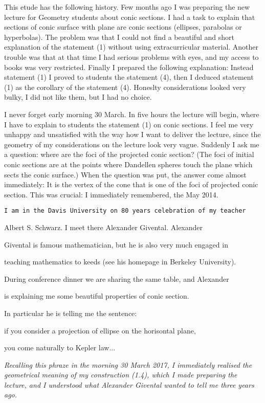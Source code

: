 {
  This etude has the following history.
Few months ago I was preparing the new lecture for 
Geometry students about conic sections.  
I had a task to explain
that sections of conic surface with plane are conic sections
  (ellipses, parabolas or hyperbolas).    
The problem was 
 that I could not  find a beautiful and 
short explanation
of the statement (1) without using extracurricular 
material.  Another trouble was that at that time I had
 serious problems with eyes,
and my  access to books was very restricted.
Finally I prepared the following  explanation:
Instead statement (1) I proved to students
the statement (4), then I deduced  
statement (1) as the corollary of the statement (4).
Honeslty  considerations looked very bulky, 
I did not like them, but I had no choice.   
 
   I never forget early morning 30 March.  
 In five  hours the lecture will begin, 
where I have to explain to students the statement
(1) on conic sections.
I feel me very unhappy and unsatisfied with  
the way how I want to deliver the lecture, 
since the geometry of my considerations on the lecture
look very vague.
 Suddenly I ask me a question:  
  where are the foci of the projected conic section? 
(The foci of initial conic sections are at 
the points  where
 Dandellen spheres touch the plane which sects the conic surface.)  
   When the question was put, 
the answer come almost immediately:
  It is the vertex of the cone 
that is one of  the foci of projected
  conic section. This was crucial:
I immediately remembered, the May 2014.  


{\tt I am in the  
 Davis University
on 80 years celebration of my teacher 

 Albert S. Schwarz.
I meet there Alexander Givental. Alexander 

Givental is famous mathematician, 
but he is also
very much  engaged  in 

teaching mathematics to keeds
(see his homepage in Berkeley University).

During conference 
dinner we are sharing the same table, and Alexander

is explaining me some beautiful 
properties of conic section.

In  particular he is telling  
me  the sentence: 

 if you consider  a projection of
ellipse on the horisontal plane, 

you come naturally to
Kepler law...
}
 
  {\sl Recalling this phraze in 
the morning 30 March 2017,
 I immediately realised the geometrical meaning
of my construction (1.4), which I made preparing the lecture, and I understood what Alexander Givental wanted
to tell me three years ago.   
} 


}
